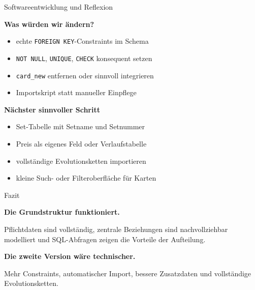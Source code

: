 \documentclass[aspectratio=169,11pt]{beamer}
\begin{document}
\begin{frame}{Softwareentwicklung und Reflexion}
  \begin{minipage}[t]{0.49\textwidth}
    \begin{panel}[colback=softred,colframe=accent!40,height=5.8cm]
      {\bfseries Was w\"urden wir \"andern?}\par
      \begin{itemize}
        \item echte \texttt{FOREIGN KEY}-Constraints im Schema
        \item \texttt{NOT NULL}, \texttt{UNIQUE}, \texttt{CHECK} konsequent setzen
        \item \texttt{card\_new} entfernen oder sinnvoll integrieren
        \item Importskript statt manueller Einpflege
      \end{itemize}
    \end{panel}
  \end{minipage}\hfill
  \begin{minipage}[t]{0.49\textwidth}
    \begin{panel}[colback=softblue,colframe=blue!40,height=5.8cm]
      {\bfseries N\"achster sinnvoller Schritt}\par
      \begin{itemize}
        \item Set-Tabelle mit Setname und Setnummer
        \item Preis als eigenes Feld oder Verlaufstabelle
        \item vollst\"andige Evolutionsketten importieren
        \item kleine Such- oder Filteroberfl\"ache f\"ur Karten
      \end{itemize}
    \end{panel}
  \end{minipage}
\end{frame}

\begin{frame}{Fazit}
  \begin{panel}[colback=softgreen,colframe=green!40]
    {\Large\bfseries Die Grundstruktur funktioniert.}\par
    \vspace{0.3em}
    \large Pflichtdaten sind vollst\"andig, zentrale Beziehungen sind nachvollziehbar modelliert und SQL-Abfragen zeigen die Vorteile der Aufteilung.
  \end{panel}
  \vspace{0.4cm}
  \begin{panel}[colback=softgold,colframe=gold!45]
    {\Large\bfseries Die zweite Version w\"are technischer.}\par
    \vspace{0.3em}
    \large Mehr Constraints, automatischer Import, bessere Zusatzdaten und vollst\"andige Evolutionsketten.
  \end{panel}
  \vfill
\end{frame}
\end{document}
